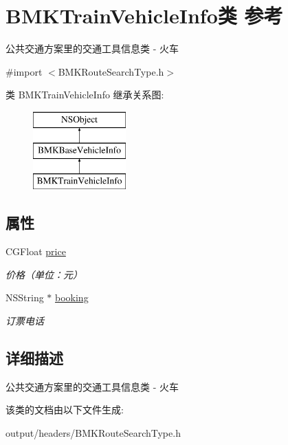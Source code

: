 \hypertarget{interface_b_m_k_train_vehicle_info}{}\section{B\+M\+K\+Train\+Vehicle\+Info类 参考}
\label{interface_b_m_k_train_vehicle_info}


公共交通方案里的交通工具信息类 -\/ 火车  




{\ttfamily \#import $<$B\+M\+K\+Route\+Search\+Type.\+h$>$}

类 B\+M\+K\+Train\+Vehicle\+Info 继承关系图\+:\begin{figure}[H]
\begin{center}
\leavevmode
\includegraphics[height=3.000000cm]{interface_b_m_k_train_vehicle_info}
\end{center}
\end{figure}
\subsection*{属性}
\begin{DoxyCompactItemize}
\item 
\hypertarget{interface_b_m_k_train_vehicle_info_af09f5b998223c37bf393a0fe7347460d}{}C\+G\+Float \hyperlink{interface_b_m_k_train_vehicle_info_af09f5b998223c37bf393a0fe7347460d}{price}\label{interface_b_m_k_train_vehicle_info_af09f5b998223c37bf393a0fe7347460d}

\begin{DoxyCompactList}\small\item\em 价格（单位：元） \end{DoxyCompactList}\item 
\hypertarget{interface_b_m_k_train_vehicle_info_a00f4b1bfb26f1587486be97ee47e4ad1}{}N\+S\+String $\ast$ \hyperlink{interface_b_m_k_train_vehicle_info_a00f4b1bfb26f1587486be97ee47e4ad1}{booking}\label{interface_b_m_k_train_vehicle_info_a00f4b1bfb26f1587486be97ee47e4ad1}

\begin{DoxyCompactList}\small\item\em 订票电话 \end{DoxyCompactList}\end{DoxyCompactItemize}


\subsection{详细描述}
公共交通方案里的交通工具信息类 -\/ 火车 

该类的文档由以下文件生成\+:\begin{DoxyCompactItemize}
\item 
output/headers/B\+M\+K\+Route\+Search\+Type.\+h\end{DoxyCompactItemize}
